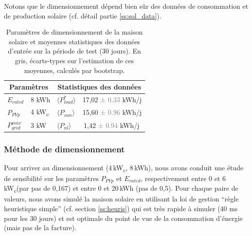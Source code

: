 \documentclass[a4paper,10pt,twocolumn]{article}
\providecommand{\avg}[1]{\langle#1\rangle}
\newcommand\sub[1]{\textsubscript{#1}}
\newcommand\kWc{kW\sub{c}{}}
\providecommand{\deta}[1]{\textcolor{gray}{#1}}
\begin{document}
Notons que le dimensionnement dépend bien sûr des données
de consommation et de production solaire (cf. détail partie \ref{ss:sol_data}).

\begin{table}[!h]
\renewcommand{\arraystretch}{1.2}

\caption{Paramètres de dimensionnement de la maison solaire
et moyennes statistiques des données d'entrée sur la période de test
(30 jours).
En gris, écarts-types sur l'estimation de ces moyennes,
calculés par bootstrap.}
\label{tab:dim_stats}

\noindent
\centering
  \begin{center}
    \begin{tabular}{l l l l}
      \toprule
      \multicolumn{2}{c}{Paramètres} & \multicolumn{2}{c}{Statistiques des données} \\
      \midrule
      $E_{rated}$       & 8 kWh  & $\avg{P_{load}^*}$ &    17,02 \deta{± 0.33} kWh/j\\
      $P_{PVp}$         & 4 \kWc  & $\avg{P_{sun}}$    &    15,60 \deta{± 0.96} kWh/j\\
      $P_{grid}^{max}$  & 3 kW   & $\avg{P_{nl}}$     & \;\,1,42 \deta{± 0.94} kWh/j\\
      \bottomrule
    \end{tabular}
  \end{center}
\end{table}

\subsubsection{Méthode de dimensionnement}

Pour arriver au dimensionnement (4\,\kWc, 8\,kWh), nous avons conduit une étude
de sensibilité sur les paramètres $P_{PVp}$ et $E_{rated}$, respectivement
entre 0 et 6\,\kWc (par pas de 0,167) et entre 0 et 20\,kWh (pas de 0,5).
Pour chaque paire de valeurs, nous avons simulé la maison solaire
en utilisant la loi de gestion ``règle heuristique simple'' (cf. section \ref{ss:heuris})
qui est très rapide à simuler (40 ms pour les 30 jours) et est optimale
du point de vue de la consommation d'énergie (mais pas de la facture).
\end{document}
